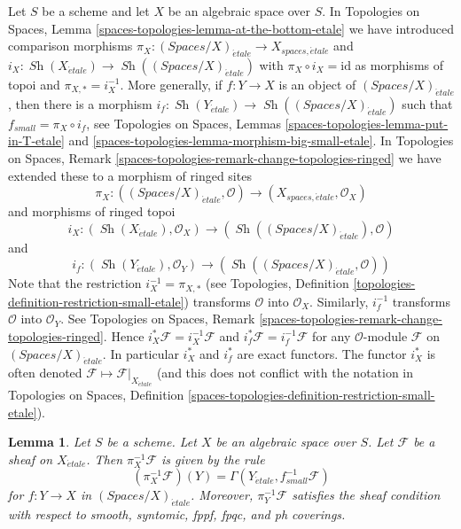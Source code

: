 \documentclass{stacks-project}
\theoremstyle{plain}
\newtheorem{lemma}[subsection]{Lemma}
\theoremstyle{definition}
\theoremstyle{remark}
\numberwithin{equation}{subsection}
\def\Sh{\mathop{\mathit{Sh}}\nolimits}
\def\etale{{\acute{e}tale}}
\begin{document}
\noindent
Let $S$ be a scheme and let $X$ be an algebraic space over $S$.
In Topologies on Spaces, Lemma
\ref{spaces-topologies-lemma-at-the-bottom-etale}
we have introduced comparison morphisms
$\pi_X : (\textit{Spaces}/X)_\etale \to X_{spaces, \etale}$ and
$i_X : \Sh(X_\etale) \to \Sh((\textit{Spaces}/X)_\etale)$
with $\pi_X \circ i_X = \text{id}$ as morphisms of topoi and
$\pi_{X, *} = i_X^{-1}$.
More generally, if $f : Y \to X$ is an object of $(\textit{Spaces}/X)_\etale$,
then there is a morphism
$i_f : \Sh(Y_\etale) \to \Sh((\textit{Spaces}/X)_\etale)$
such that $f_{small} = \pi_X \circ i_f$, see
Topologies on Spaces, Lemmas \ref{spaces-topologies-lemma-put-in-T-etale} and
\ref{spaces-topologies-lemma-morphism-big-small-etale}. In
Topologies on Spaces, Remark
\ref{spaces-topologies-remark-change-topologies-ringed}
we have extended these to a morphism of ringed sites
$$
\pi_X :
((\textit{Spaces}/X)_\etale, \mathcal{O})
\to
(X_{spaces, \etale}, \mathcal{O}_X)
$$
and morphisms of ringed topoi
$$
i_X :
(\Sh(X_\etale), \mathcal{O}_X)
\to
(\Sh((\textit{Spaces}/X)_\etale), \mathcal{O})
$$
and
$$
i_f :
(\Sh(Y_\etale), \mathcal{O}_Y)
\to
(\Sh((\textit{Spaces}/X)_\etale, \mathcal{O}))
$$
Note that the restriction $i_X^{-1} = \pi_{X, *}$ (see
Topologies, Definition \ref{topologies-definition-restriction-small-etale})
transforms $\mathcal{O}$ into $\mathcal{O}_X$.
Similarly, $i_f^{-1}$ transforms $\mathcal{O}$ into $\mathcal{O}_Y$.
See Topologies on Spaces, Remark
\ref{spaces-topologies-remark-change-topologies-ringed}.
Hence $i_X^*\mathcal{F} = i_X^{-1}\mathcal{F}$ and
$i_f^*\mathcal{F} = i_f^{-1}\mathcal{F}$ for any $\mathcal{O}$-module
$\mathcal{F}$ on $(\textit{Spaces}/X)_\etale$. In particular $i_X^*$ and $i_f^*$
are exact functors. The functor $i_X^*$ is often denoted
$\mathcal{F} \mapsto \mathcal{F}|_{X_\etale}$ (and this does not
conflict with the notation in
Topologies on Spaces, Definition
\ref{spaces-topologies-definition-restriction-small-etale}).

\begin{lemma}
\label{lemma-describe-pullback}
Let $S$ be a scheme. Let $X$ be an algebraic space over $S$.
Let $\mathcal{F}$ be a sheaf on $X_\etale$. Then
$\pi_X^{-1}\mathcal{F}$ is given by the rule
$$
(\pi_X^{-1}\mathcal{F})(Y) = \Gamma(Y_\etale, f_{small}^{-1}\mathcal{F})
$$
for $f : Y \to X$ in $(\textit{Spaces}/X)_\etale$.
Moreover, $\pi_Y^{-1}\mathcal{F}$ satisfies the
sheaf condition with respect to smooth, syntomic, fppf, fpqc, and ph coverings.
\end{lemma}
\end{document}
